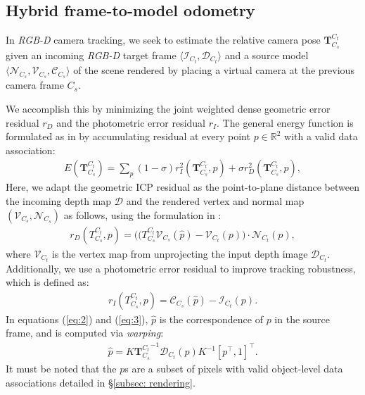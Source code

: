 \subsection{Hybrid frame-to-model odometry} \label{subsec: tracking}

In \textit{RGB-D} camera tracking, we seek to estimate the relative camera pose \(\mathbf{T}^{C_t}_{C_s}\) given an incoming \textit{RGB-D} target frame \( \langle \mathcal{I}_{C_t}, \mathcal{D}_{C_t}\rangle \) and a source model \( \langle \mathcal{N}_{C_{s}}, \mathcal{V}_{C_{s}}, \mathcal{C}_{C_{s}}\rangle \) of the scene rendered by placing a virtual camera at the previous camera frame ${C_s}$.

We accomplish this by minimizing the joint weighted dense geometric error residual $r_D$ and the photometric error residual $r_I$. The general energy function is formulated as in \cite{parkColoredPointCloud2017} by accumulating residual at every point $p \in \mathbb{R}^2$ with a valid data association:
\begin{multline}
    E(\mathbf{T}^{C_t}_{C_{s}}) = \sum_{p} (1 - \sigma) r_I^2(\mathbf{T}^{C_t}_{C_s}, p)
    + \sigma r_D^2(\mathbf{T}^{C_t}_{C_s}, p), \label{eq:1}
\end{multline}
Here, we adapt the geometric ICP residual as the point-to-plane distance between the incoming depth map $\mathcal{D}$ and the rendered vertex and normal map $(\mathcal{V}_{C_s}, \mathcal{N}_{C_s})$ as follows, using the formulation in \cite{newcombeKinectFusionRealtimeDense2011}:
\begin{align}
    r_D(T^{C_t}_{C_s}, p) = \bigg((T^{C_t}_{C_{s}} \mathcal{V}_{C_s}( \hat{p} ) - \mathcal{V}_{C_{t}}(p )\bigg) \cdot \mathcal{N}_{C_{t}}( p ), \label{eq:2}
\end{align}
where $\mathcal{V}_{C_t}$ is the vertex map from unprojecting the input depth image $\mathcal{D}_{C_t}$.
Additionally, we use a photometric error residual to improve tracking robustness, which is defined as:
\begin{align}
    r_I(T^{C_t}_{C_s}, p) = \mathcal{C}_{C_s}(\hat{p}) - \mathcal{I}_{C_t}(p). \label{eq:3}
\end{align}
In equations (\ref{eq:2}) and (\ref{eq:3}), $\hat{p}$ is the correspondence of $p$ in the source frame, and is computed via \textit{warping}:
\begin{align}
    \hat{p} = K {\mathbf{T}^{C_t}_{C_s}}^{-1}\mathcal{D}_{C_t}(p)K^{-1}[p^\top, 1]^\top. \label{eq:4}
\end{align}
It must be noted that the $p$s are a subset of pixels with valid object-level data associations detailed in \S\ref{subsec: rendering}.

